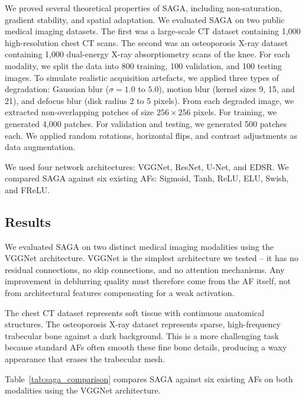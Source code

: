 We proved several theoretical properties of SAGA, including non-saturation, gradient stability, and spatial adaptation.
We evaluated SAGA on two public medical imaging datasets. The first was a large-scale CT dataset \citep{syed2024medical} containing 1,000 high-resolution chest CT scans. The second was an osteoporosis X-ray dataset \citep{wani2021knee} containing 1,000 dual-energy X-ray absorptiometry scans of the knee. For each modality, we split the data into 800 training, 100 validation, and 100 testing images. To simulate realistic acquisition artefacts, we applied three types of degradation: Gaussian blur (\(\sigma = 1.0\) to \(5.0\)), motion blur (kernel sizes 9, 15, and 21), and defocus blur (disk radius 2 to 5 pixels). From each degraded image, we extracted non-overlapping patches of size \(256 \times 256\) pixels. For training, we generated 4,000 patches. For validation and testing, we generated 500 patches each. We applied random rotations, horizontal flips, and contrast adjustments as data augmentation.

We used four network architectures: VGGNet, ResNet, U-Net, and EDSR. We compared SAGA against six existing AFs: Sigmoid, Tanh, ReLU, ELU, Swish, and FReLU.

\subsection{Results}

We evaluated SAGA on two distinct medical imaging modalities using the VGGNet architecture. VGGNet is the simplest architecture we tested – it has no residual connections, no skip connections, and no attention mechanisms. Any improvement in deblurring quality must therefore come from the AF itself, not from architectural features compensating for a weak activation.

The chest CT dataset represents soft tissue with continuous anatomical structures. The osteoporosis X-ray dataset represents sparse, high-frequency trabecular bone against a dark background. This is a more challenging task because standard AFs often smooth these fine bone details, producing a waxy appearance that erases the trabecular mesh.

Table~\ref{tab:saga_comparison} compares SAGA against six existing AFs on both modalities using the VGGNet architecture.

